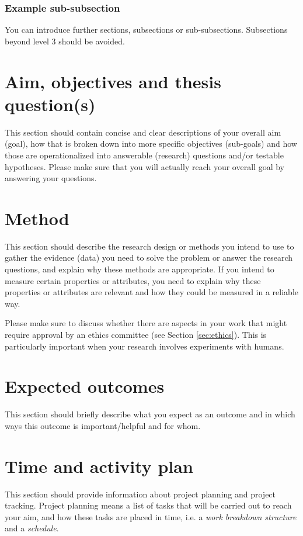 \documentclass[12pt,a4paper,twoside]{article}
\begin{document}
\subsubsection{Example sub-subsection}
You can introduce further sections, subsections or sub-subsections. Subsections beyond level 3 should be avoided.


\section{Aim, objectives and thesis question(s)}
\label{sec:aim}
This section should contain concise and clear descriptions of your overall aim (goal),
how that is broken down into more specific objectives (sub-goals) and how those are
operationalized into answerable (research) questions and/or testable hypotheses.
Please make sure that you will actually reach your overall goal by answering your questions.


\section{Method}
\label{sec:method}
This section should describe the research design or methods you intend to use to gather the evidence (data) you need to solve the problem or answer the research questions, and explain why these
methods are appropriate. If you intend to measure certain properties or attributes, you
need to explain why these properties or attributes are relevant and how they could be measured
in a reliable way.

Please make sure to discuss whether there are aspects in your work that might require
approval by an ethics committee (see Section \ref{sec:ethics}). This is particularly important
when your research involves experiments with humans.


\section{Expected outcomes}
\label{sec:outcome}
This section should briefly describe what you expect as an outcome and in which ways this outcome is important/helpful and for whom.


\section{Time and activity plan}
\label{sec:plan}
This section should provide information about project planning and project tracking.
Project planning means a list of tasks that will be carried out to reach your aim,
and how these tasks are placed in time, i.e. a \textit{work breakdown structure}
and a \textit{schedule}.
\end{document}
